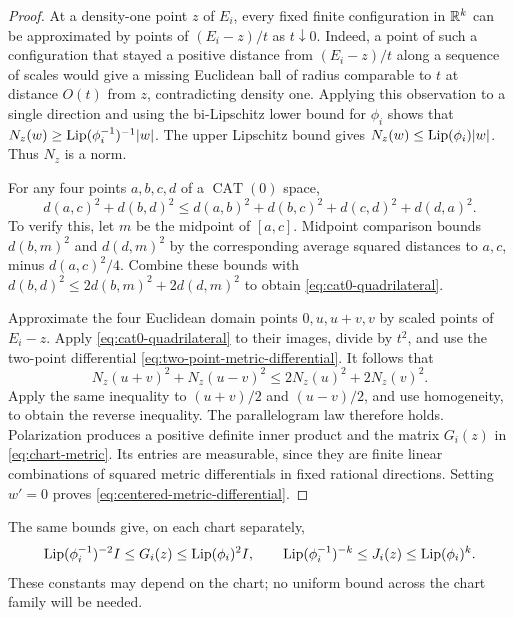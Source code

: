 \begin{proof}
At a density-one point \(z\) of \(E_i\), every fixed finite configuration
in \(\mathbb R^k\) can be approximated by points of \((E_i-z)/t\) as
\(t\downarrow0\). Indeed, a point of such a configuration that stayed
a positive distance from \((E_i-z)/t\) along a sequence of scales would
give a missing Euclidean ball of radius comparable to \(t\) at distance
\(O(t)\) from \(z\), contradicting density one. Applying this observation
to a single direction and using the bi-Lipschitz lower bound for
\(\phi_i\) shows that \(N_z(w)\ge\operatorname{Lip}(\phi_i^{-1})^{-1}|w|\).
The upper Lipschitz bound gives \(N_z(w)\le\operatorname{Lip}(\phi_i)|w|\).
Thus \(N_z\) is a norm.

For any four points \(a,b,c,d\) of a \(\operatorname{CAT}(0)\) space,
\begin{equation}
\label{eq:cat0-quadrilateral}
 d(a,c)^2+d(b,d)^2
 \le d(a,b)^2+d(b,c)^2+d(c,d)^2+d(d,a)^2.
\end{equation}
To verify this, let \(m\) be the midpoint of \([a,c]\). Midpoint
comparison bounds \(d(b,m)^2\) and \(d(d,m)^2\) by the corresponding
average squared distances to \(a,c\), minus \(d(a,c)^2/4\).
Combine these bounds with
\(d(b,d)^2\le2d(b,m)^2+2d(d,m)^2\) to obtain
\eqref{eq:cat0-quadrilateral}.

Approximate the four Euclidean domain points \(0,u,u+v,v\) by scaled
points of \(E_i-z\). Apply \eqref{eq:cat0-quadrilateral} to their images,
divide by \(t^2\), and use the two-point differential
\eqref{eq:two-point-metric-differential}. It follows that
\[
 N_z(u+v)^2+N_z(u-v)^2\le2N_z(u)^2+2N_z(v)^2.
\]
Apply the same inequality to \((u+v)/2\) and \((u-v)/2\), and use
homogeneity, to obtain the reverse inequality. The parallelogram law
therefore holds. Polarization produces a positive definite inner product
and the matrix \(G_i(z)\) in \eqref{eq:chart-metric}. Its entries are
measurable, since they are finite linear combinations of squared metric
differentials in fixed rational directions. Setting \(w'=0\) proves
\eqref{eq:centered-metric-differential}.
\end{proof}

The same bounds give, on each chart separately,
\begin{equation}
\label{eq:chart-metric-bounds}
 \operatorname{Lip}(\phi_i^{-1})^{-2}I\le G_i(z)\le\operatorname{Lip}(\phi_i)^2I,
 \qquad
 \operatorname{Lip}(\phi_i^{-1})^{-k}\le J_i(z)\le\operatorname{Lip}(\phi_i)^k.
\end{equation}
These constants may depend on the chart; no uniform bound across the
chart family will be needed.

